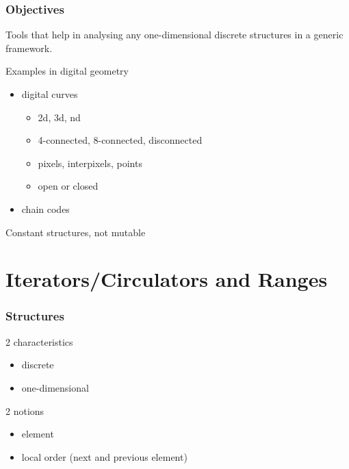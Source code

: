 \begin{frame}
\frametitle{Objectives}

Tools that help in analysing any one-dimensional discrete structures in a generic framework. 

  \begin{block}{Examples in digital geometry}
    \begin{itemize}
    \item digital curves
      \begin{itemize}
      \item 2d, 3d, nd
      \item 4-connected, 8-connected, disconnected
      \item pixels, interpixels, points
      \item open or closed
      \end{itemize}
		\item chain codes
    \end{itemize}
  \end{block}

\alert{Constant structures, not mutable} 

\end{frame}

\section{Iterators/Circulators and Ranges}


\begin{frame}
  \frametitle{Structures}

  \begin{block}{2 characteristics}
    \begin{itemize}
		\item discrete
    \item one-dimensional
    \end{itemize}
  \end{block}

  \begin{block}{2 notions}
    \begin{itemize}
    \item element
    \item local order (next and previous element)
    \end{itemize}
  \end{block}



\end{frame}

